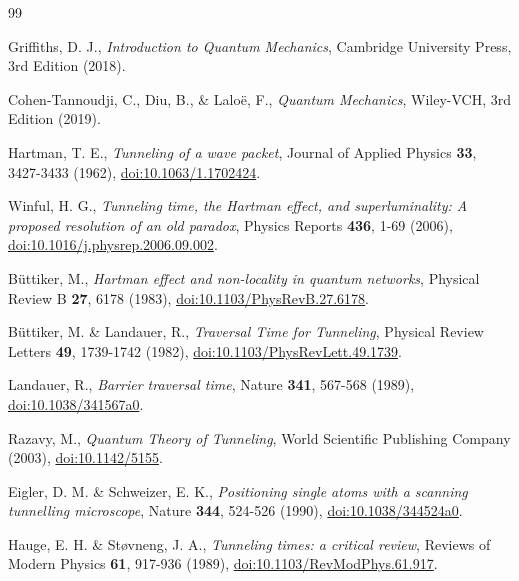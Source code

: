 \documentclass[%
 reprint,
 amsmath,amssymb,
 aps,
]{revtex4-1}
\numberwithin{equation}{section}%
\begin{document}

\begin{thebibliography}{99}

Griffiths, D. J.,
\textit{Introduction to Quantum Mechanics},
Cambridge University Press, 3rd Edition (2018).

Cohen-Tannoudji, C., Diu, B., \& Laloë, F.,
\textit{Quantum Mechanics},
Wiley-VCH, 3rd Edition (2019).

Hartman, T. E.,
\textit{Tunneling of a wave packet},
Journal of Applied Physics \textbf{33}, 3427-3433 (1962),
\href{https://doi.org/10.1063/1.1702424}{doi:10.1063/1.1702424}.

Winful, H. G.,
\textit{Tunneling time, the Hartman effect, and superluminality: A proposed resolution of an old paradox},
Physics Reports \textbf{436}, 1-69 (2006),
\href{https://doi.org/10.1016/j.physrep.2006.09.002}{doi:10.1016/j.physrep.2006.09.002}.

Büttiker, M.,
\textit{Hartman effect and non-locality in quantum networks},
Physical Review B \textbf{27}, 6178 (1983),
\href{https://doi.org/10.1103/PhysRevB.27.6178}{doi:10.1103/PhysRevB.27.6178}.

Büttiker, M. \& Landauer, R.,
\textit{Traversal Time for Tunneling},
Physical Review Letters \textbf{49}, 1739-1742 (1982),
\href{https://doi.org/10.1103/PhysRevLett.49.1739}{doi:10.1103/PhysRevLett.49.1739}.

Landauer, R.,
\textit{Barrier traversal time},
Nature \textbf{341}, 567-568 (1989),
\href{https://doi.org/10.1038/341567a0}{doi:10.1038/341567a0}.

Razavy, M.,
\textit{Quantum Theory of Tunneling},
World Scientific Publishing Company (2003),
\href{https://doi.org/10.1142/5155}{doi:10.1142/5155}.

Eigler, D. M. \& Schweizer, E. K.,
\textit{Positioning single atoms with a scanning tunnelling microscope},
Nature \textbf{344}, 524-526 (1990),
\href{https://doi.org/10.1038/344524a0}{doi:10.1038/344524a0}.

Hauge, E. H. \& Støvneng, J. A.,
\textit{Tunneling times: a critical review},
Reviews of Modern Physics \textbf{61}, 917-936 (1989),
\href{https://doi.org/10.1103/RevModPhys.61.917}{doi:10.1103/RevModPhys.61.917}.


\end{thebibliography}
\end{document}
